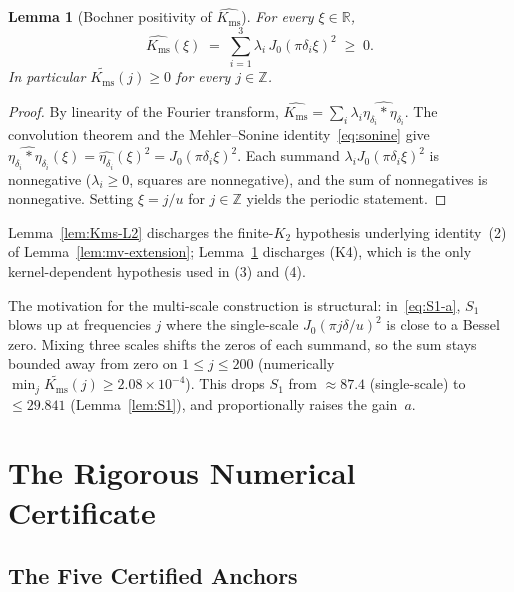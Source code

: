 \documentclass[11pt, letterpaper]{article}
\theoremstyle{paperplain}
\newtheorem{lemma}[theorem]{Lemma}
\theoremstyle{paperdef}
\newcommand{\R}{\mathbb{R}}
\newcommand{\Z}{\mathbb{Z}}
\newcommand{\Kms}{K_{\mathrm{ms}}}
\begin{document}
\begin{lemma}[Bochner positivity of $\widehat{\Kms}$]
\label{lem:Kms-pos}
For every $\xi\in\R$,
\[
  \widehat{\Kms}(\xi)
  \;=\;\sum_{i=1}^{3}\lambda_i\,J_0(\pi\delta_i\xi)^{2}
  \;\ge\; 0.
\]
In particular $\widetilde{\Kms}(j)\ge 0$ for every $j\in\Z$.
\end{lemma}

\begin{proof}
By linearity of the Fourier transform,
$\widehat{\Kms}=\sum_i\lambda_i\widehat{\eta_{\delta_i}*\eta_{\delta_i}}$.
The convolution theorem and the Mehler--Sonine
identity~\eqref{eq:sonine} give
$\widehat{\eta_{\delta_i}*\eta_{\delta_i}}(\xi)
=\widehat{\eta_{\delta_i}}(\xi)^{2}=J_0(\pi\delta_i\xi)^{2}$.
Each summand $\lambda_i J_0(\pi\delta_i\xi)^{2}$ is nonnegative
($\lambda_i\ge 0$, squares are nonnegative), and the sum of
nonnegatives is nonnegative.  Setting $\xi=j/u$ for $j\in\Z$ yields
the periodic statement.
\end{proof}

\noindent
Lemma~\ref{lem:Kms-L2} discharges the finite-$K_2$ hypothesis
underlying identity~(2) of
Lemma~\ref{lem:mv-extension}; Lemma~\ref{lem:Kms-pos} discharges
(K4), which is the only kernel-dependent hypothesis used in (3)
and (4).

The motivation for the multi-scale construction is structural:
in~\eqref{eq:S1-a}, $S_1$ blows up at
frequencies $j$ where the single-scale $J_0(\pi j\delta/u)^2$ is close
to a Bessel zero.  Mixing three scales shifts the zeros of each
summand, so the sum stays bounded away from zero on $1\le j\le 200$
(numerically $\min_j\widetilde{\Kms}(j)\ge 2.08\times 10^{-4}$).  This
drops $S_1$ from $\approx 87.4$ (single-scale) to $\le 29.841$
(Lemma~\ref{lem:S1}), and proportionally raises the gain~$a$.

\section{The Rigorous Numerical Certificate}\label{sec:cert}

\subsection{The Five Certified Anchors}\label{subsec:cert-anchors}
\end{document}
